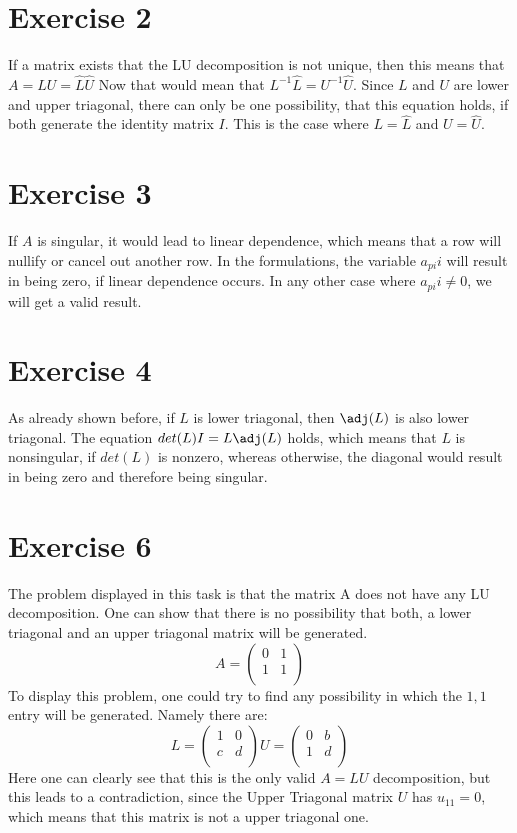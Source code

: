 \section{Exercise 2}

If a matrix exists that the LU decomposition is not unique, then this means that $ A = LU = \hat{L}\hat{U} $
Now that would mean that $L^{-1}\hat{L} = U^{-1}\hat{U}$. Since $L$ and $U$ are lower and upper triagonal, there can only be one possibility, that this equation holds, if both generate the identity matrix $I$. This is the case where $L = \hat{L}$ and $U = \hat{U}$.

\section{Exercise 3}

If $A$ is singular, it would lead to linear dependence, which means that a row will nullify or cancel out another row. In the formulations, the variable $a_{pi}i$ will result in being zero, if linear dependence occurs.
In any other case where $a_{pi}i \neq 0$, we will get a valid result.

\section{Exercise 4}
As already shown before, if $L$ is lower triagonal, then $\adj(L)$ is also lower triagonal. The equation $det(L) I = L \adj(L)$ holds, which means that $L$ is nonsingular, if $det(L)$ is nonzero, whereas otherwise, the diagonal would result in being zero and therefore being singular.

\section{Exercise 6}
The problem displayed in this task is that the matrix A does not have any LU decomposition. One can show that there is no possibility that both, a lower triagonal and an upper triagonal matrix will be generated.
\begin{equation}
A = \left( \begin{array}{ccc}
0 & 1\\
1 & 1\\
\end{array} \right) 
\end{equation}
To display this problem, one could try to find any possibility in which the $1,1$ entry will be generated. Namely there are:
\begin{equation}
L = \left( \begin{array}{ccc}
1 & 0\\
c & d\\
\end{array} \right) 
U = \left( \begin{array}{ccc}
0 & b\\
1 & d\\
\end{array} \right) 
\end{equation}
Here one can clearly see that this is the only valid $A = LU$ decomposition, but this leads to a contradiction, since the Upper Triagonal matrix $U$ has $u_{11} = 0$, which means that this matrix is not a upper triagonal one.

